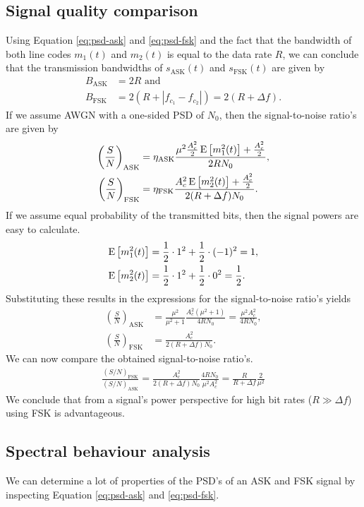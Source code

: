 \documentclass[11pt,titlepage]{report}
\begin{document}
\begin{appendices}
\subsection{Signal quality comparison}
Using Equation \ref{eq:psd-ask} and \ref{eq:psd-fsk} and the fact that the bandwidth of both line codes $m_1(t)$ and $m_2(t)$ is equal to the data rate $R$, we can conclude that the transmission bandwidths of $s_{\text{ASK}}(t)$ and $s_{\text{FSK}}(t)$ are given by
\begin{align*}
	B_{\text{ASK}} &= 2R \text{ and } \\
	B_{\text{FSK}} &= 2(R + |f_{c_1} - f_{c_2}|) = 2(R + \Delta f).
\end{align*}
If we assume AWGN with a one-sided PSD of $N_0$, then the signal-to-noise ratio's are given by
\begin{align*}
	\left(\frac{S}{N}\right)_{\text{ASK}} &= \eta_{\text{ASK}} \frac{\mu^2 \frac{A_c^2}{2}\operatorname{E}\left[m_1^2(t)\right] + \frac{A_c^2}{2}}{2RN_0}, \\
	\left(\frac{S}{N}\right)_{\text{FSK}} &= \eta_{\text{FSK}} \frac{A_c^2 \operatorname{E}\left[m_2^2(t)\right] + \frac{A_c^2}{2}}{2(R+\Delta f)N_0}.
\end{align*}
If we assume equal probability of the transmitted bits, then the signal powers are easy to calculate.
\begin{align*}
	\operatorname{E}\left[m_1^2(t)\right] &= \frac{1}{2} \cdot 1^2 + \frac{1}{2} \cdot (-1)^2=1, \\
	\operatorname{E}\left[m_2^2(t)\right] &= \frac{1}{2} \cdot 1^2 + \frac{1}{2} \cdot 0^2=\frac{1}{2}.
\end{align*}
Substituting these results in the expressions for the signal-to-noise ratio's yields
\begin{align*}
	\left(\frac{S}{N}\right)_{\text{ASK}} &= \frac{\mu^2}{\mu^2+1} \frac{A_c^2 (\mu^2+1)}{4RN_0} = \frac{\mu^2 A_c^2}{4RN_0}, \\
	\left(\frac{S}{N}\right)_{\text{FSK}} &= \frac{A_c^2}{2(R+\Delta f)N_0}.
\end{align*}
We can now compare the obtained signal-to-noise ratio's.
\begin{align*}
	\frac{(S/N)_{\text{FSK}}}{(S/N)_{\text{ASK}}}=\frac{A_c^2}{2(R+\Delta f)N_0} \frac{4RN_0}{\mu^2 A_c^2}=\frac{R}{R+\Delta f}\frac{2}{\mu^2}
\end{align*}
We conclude that from a signal's power perspective for high bit rates ($R \gg \Delta f$) using FSK is advantageous.
\subsection{Spectral behaviour analysis}
We can determine a lot of properties of the PSD's of an ASK and FSK signal by inspecting Equation \ref{eq:psd-ask} and \ref{eq:psd-fsk}.


\end{appendices}
\end{document}
